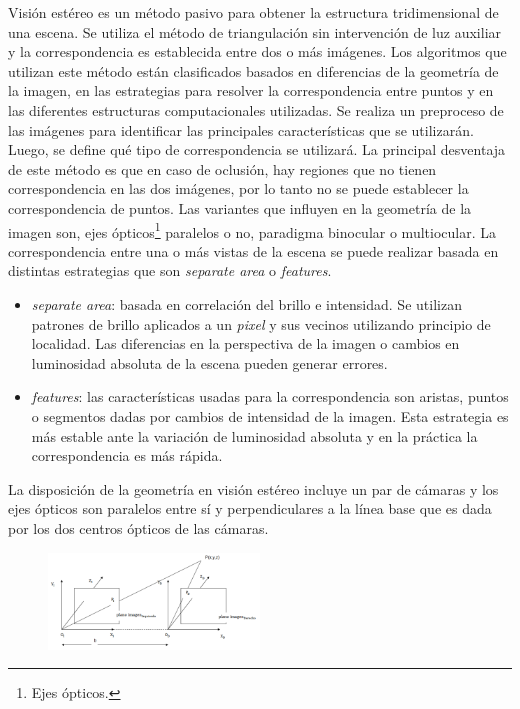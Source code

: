 Visión estéreo es un método pasivo para obtener la estructura tridimensional de una escena. Se utiliza el método de triangulación sin intervención de luz auxiliar y la correspondencia es establecida entre dos o más imágenes.
Los algoritmos que utilizan este método están clasificados basados en diferencias de la geometría de la imagen, en las estrategias para resolver la correspondencia entre puntos y en las diferentes estructuras computacionales utilizadas\cite{StereoReview}.
Se realiza un preproceso de las imágenes para identificar las principales características que se utilizarán. Luego, se define qué tipo de correspondencia se utilizará.
La principal desventaja de este método es que en caso de oclusión, hay regiones que no tienen correspondencia en las dos imágenes, por lo tanto no se puede establecer la correspondencia de puntos.
Las variantes que influyen en la geometría de la imagen son, ejes ópticos\footnote{Ejes ópticos.} paralelos o no, paradigma binocular o multiocular.
La correspondencia entre una o más vistas de la escena se puede realizar basada en distintas estrategias que son \emph{separate area} o \emph{features}.
\begin{itemize}
   \item \emph{separate area}: basada en correlación del brillo e intensidad. Se utilizan patrones de brillo aplicados a un \emph{pixel} y sus vecinos utilizando principio de localidad. Las diferencias en la perspectiva de la imagen o cambios en luminosidad absoluta de la escena pueden generar errores.
   \item \emph{features}: las características usadas para la correspondencia son aristas, puntos o segmentos dadas por cambios de intensidad de la imagen. Esta estrategia es más estable ante la variación de luminosidad absoluta y en la práctica la correspondencia es más rápida.
\end{itemize}
La disposición de la geometría en visión estéreo incluye un par de cámaras y los ejes ópticos son paralelos entre sí y perpendiculares a la línea base que es dada por los dos centros ópticos de las cámaras.

\begin{figure}[H]
  \centering
    \includegraphics[width=0.5\textwidth]{./Cap6_reconstruccion/stereo.PNG}
  \caption{}
  \label{fig:Stereo}
\end{figure}

